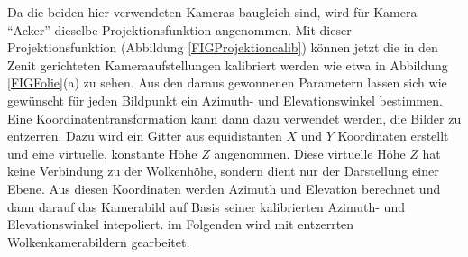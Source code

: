 \documentclass[a4paper,11pt,twoside,german]{article}
\newcommand{\absatz}{\smallbreak}
\begin{document}
Da die beiden hier verwendeten Kameras baugleich sind, wird für Kamera
\enquote{Acker} dieselbe Projektionsfunktion angenommen.  Mit dieser
Projektionsfunktion (Abbildung \ref{FIGProjektioncalib}) können jetzt die in den
Zenit gerichteten Kameraaufstellungen kalibriert werden wie etwa in Abbildung
\ref{FIGFolie}(a) zu sehen. Aus den daraus gewonnenen Parametern lassen sich wie
gewünscht für jeden Bildpunkt ein Azimuth- und Elevationswinkel bestimmen. 
\absatz 
Eine Koordinatentransformation kann dann dazu verwendet werden, die
Bilder zu entzerren. Dazu wird ein Gitter aus equidistanten $X$ und $Y$
Koordinaten erstellt und eine virtuelle, konstante Höhe $Z$ angenommen. Diese
virtuelle Höhe $Z$ hat keine Verbindung zu der Wolkenhöhe, sondern dient nur der
Darstellung einer Ebene. Aus diesen Koordinaten werden Azimuth und Elevation
berechnet und dann darauf das Kamerabild auf Basis seiner kalibrierten Azimuth-
und Elevationswinkel intepoliert.
im Folgenden wird mit entzerrten Wolkenkamerabildern gearbeitet.
\end{document}
